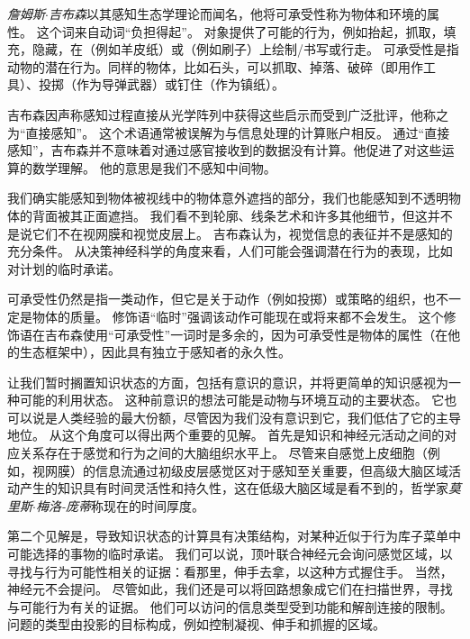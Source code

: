 \begin{proposition}[启示、感知和知识] \label{box:56_1}
	
	\quad \quad \textit{詹姆斯$\cdot$吉布森}以其感知生态学理论而闻名，他将可承受性称为物体和环境的属性。
	这个词来自动词“负担得起”。
	对象提供了可能的行为，例如抬起，抓取，填充，隐藏，在（例如羊皮纸）或（例如刷子）上绘制/书写或行走。
	可承受性是指动物的潜在行为。同样的物体，比如石头，可以抓取、掉落、破碎（即用作工具）、投掷（作为导弹武器）或钉住（作为镇纸）。
	
	\quad \quad 吉布森因声称感知过程直接从光学阵列中获得这些启示而受到广泛批评，他称之为“直接感知”。
	这个术语通常被误解为与信息处理的计算账户相反。
	通过“直接感知”，吉布森并不意味着对通过感官接收到的数据没有计算。他促进了对这些运算的数学理解。
	他的意思是我们不感知中间物。
	
	\quad \quad 我们确实能感知到物体被视线中的物体意外遮挡的部分，我们也能感知到不透明物体的背面被其正面遮挡。
	我们看不到轮廓、线条艺术和许多其他细节，但这并不是说它们不在视网膜和视觉皮层上。
	吉布森认为，视觉信息的表征并不是感知的充分条件。
	从决策神经科学的角度来看，人们可能会强调潜在行为的表现，比如对计划的临时承诺。
	
	\quad \quad 可承受性仍然是指一类动作，但它是关于动作（例如投掷）或策略的组织，也不一定是物体的质量。
	修饰语“临时”强调该动作可能现在或将来都不会发生。
	这个修饰语在吉布森使用“可承受性”一词时是多余的，因为可承受性是物体的属性（在他的生态框架中），因此具有独立于感知者的永久性。
	
\end{proposition}


让我们暂时搁置知识状态的方面，包括有意识的意识，并将更简单的知识感视为一种可能的利用状态。
这种前意识的想法可能是动物与环境互动的主要状态。
它也可以说是人类经验的最大份额，尽管因为我们没有意识到它，我们低估了它的主导地位。
从这个角度可以得出两个重要的见解。
首先是知识和神经元活动之间的对应关系存在于感觉和行为之间的大脑组织水平上。
尽管来自感觉上皮细胞（例如，视网膜）的信息流通过初级皮层感觉区对于感知至关重要，但高级大脑区域活动产生的知识具有时间灵活性和持久性，这在低级大脑区域是看不到的，哲学家\textit{莫里斯$\cdot$梅洛-庞蒂}称现在的时间厚度。


第二个见解是，导致知识状态的计算具有决策结构，对某种近似于行为库子菜单中可能选择的事物的临时承诺。
我们可以说，顶叶联合神经元会询问感觉区域，以寻找与行为可能性相关的证据：看那里，伸手去拿，以这种方式握住手。
当然，神经元不会提问。
尽管如此，我们还是可以将回路想象成它们在扫描世界，寻找与可能行为有关的证据。
他们可以访问的信息类型受到功能和解剖连接的限制。
问题的类型由投影的目标构成，例如控制凝视、伸手和抓握的区域。


